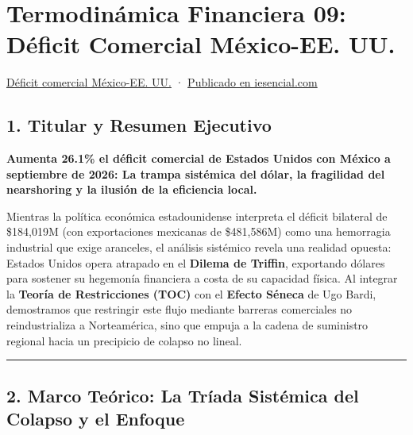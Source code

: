 \documentclass[12pt,letterpaper]{article}
\begin{document}
\hypertarget{termodinuxe1mica-financiera-09-duxe9ficit-comercial-muxe9xico-ee.-uu.}{%
\section{Termodinámica Financiera 09: Déficit Comercial México-EE.
UU.}\label{termodinuxe1mica-financiera-09-duxe9ficit-comercial-muxe9xico-ee.-uu.}}

\href{https://www.eleconomista.com.mx/empresas/aumenta-deficit-comercial-estados-unidos-mexico-septiembre-20261109-842947.html}{Déficit
comercial México-EE. UU.} ·
\href{https://www.iesencial.com/boletin/\#art=2026-11-12-Boletin-09\%3A\%20Deficit\%20comercial\%20mex-usa.md}{Publicado
en iesencial.com}

\hypertarget{titular-y-resumen-ejecutivo}{%
\subsection{1. Titular y Resumen
Ejecutivo}\label{titular-y-resumen-ejecutivo}}

\textbf{Aumenta 26.1\% el déficit comercial de Estados Unidos con México
a septiembre de 2026: La trampa sistémica del dólar, la fragilidad del
nearshoring y la ilusión de la eficiencia local.}

Mientras la política económica estadounidense interpreta el déficit
bilateral de \$184,019M (con exportaciones mexicanas de \$481,586M) como
una hemorragia industrial que exige aranceles, el análisis sistémico
revela una realidad opuesta: Estados Unidos opera atrapado en el
\textbf{Dilema de Triffin}, exportando dólares para sostener su
hegemonía financiera a costa de su capacidad física. Al integrar la
\textbf{Teoría de Restricciones (TOC)} con el \textbf{Efecto Séneca} de
Ugo Bardi, demostramos que restringir este flujo mediante barreras
comerciales no reindustrializa a Norteamérica, sino que empuja a la
cadena de suministro regional hacia un precipicio de colapso no lineal.

\begin{center}\rule{0.5\linewidth}{0.5pt}\end{center}

\hypertarget{marco-teuxf3rico-la-truxedada-sistuxe9mica-del-colapso-y-el-enfoque}{%
\subsection{2. Marco Teórico: La Tríada Sistémica del Colapso y el
Enfoque}\label{marco-teuxf3rico-la-truxedada-sistuxe9mica-del-colapso-y-el-enfoque}}
\end{document}
